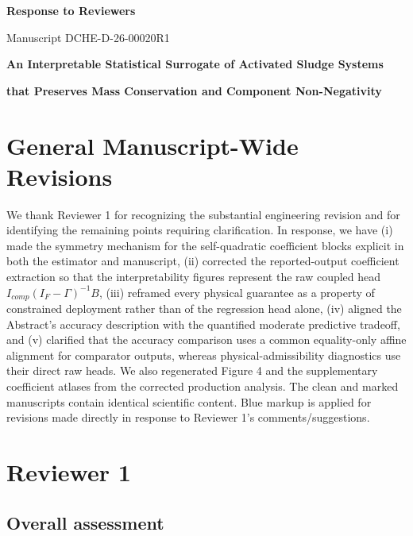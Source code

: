 \documentclass[11pt,a4paper]{article}
\begin{document}
\begin{center}
{\Large\bfseries Response to Reviewers}\par
\vspace{0.5em}
{\large Manuscript DCHE-D-26-00020R1}\par
\vspace{0.5em}
{\large\bfseries An Interpretable Statistical Surrogate of Activated Sludge Systems}\par
{\large\bfseries that Preserves Mass Conservation and Component Non-Negativity}
\end{center}

\section*{General Manuscript-Wide Revisions}

We thank Reviewer 1 for recognizing the substantial engineering revision and for identifying the remaining points requiring clarification. In response, we have (i) made the symmetry mechanism for the self-quadratic coefficient blocks explicit in both the estimator and manuscript, (ii) corrected the reported-output coefficient extraction so that the interpretability figures represent the raw coupled head $I_{comp}(I_F-\Gamma)^{-1}B$, (iii) reframed every physical guarantee as a property of constrained deployment rather than of the regression head alone, (iv) aligned the Abstract's accuracy description with the quantified moderate predictive tradeoff, and (v) clarified that the accuracy comparison uses a common equality-only affine alignment for comparator outputs, whereas physical-admissibility diagnostics use their direct raw heads. We also regenerated Figure 4 and the supplementary coefficient atlases from the corrected production analysis. The clean and marked manuscripts contain identical scientific content. Blue markup is applied for revisions made directly in response to Reviewer 1's comments/suggestions.

\section*{Reviewer 1}

\subsection*{Overall assessment}
\end{document}
